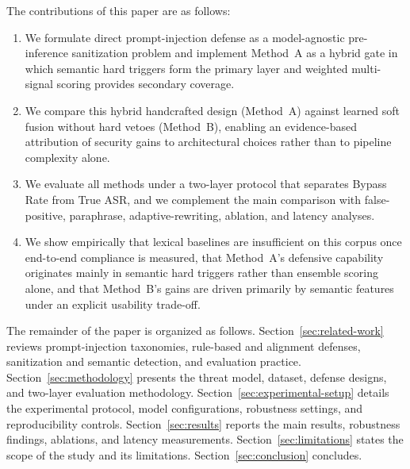 The contributions of this paper are as follows:
\begin{enumerate}
  \item We formulate direct prompt-injection defense as a model-agnostic pre-inference sanitization problem and implement Method~A as a hybrid gate in which semantic hard triggers form the primary layer and weighted multi-signal scoring provides secondary coverage.
  \item We compare this hybrid handcrafted design (Method~A) against learned soft fusion without hard vetoes (Method~B), enabling an evidence-based attribution of security gains to architectural choices rather than to pipeline complexity alone.
  \item We evaluate all methods under a two-layer protocol that separates Bypass Rate from True ASR, and we complement the main comparison with false-positive, paraphrase, adaptive-rewriting, ablation, and latency analyses.
  \item We show empirically that lexical baselines are insufficient on this corpus once end-to-end compliance is measured, that Method~A's defensive capability originates mainly in semantic hard triggers rather than ensemble scoring alone, and that Method~B's gains are driven primarily by semantic features under an explicit usability trade-off.
\end{enumerate}

The remainder of the paper is organized as follows.
Section~\ref{sec:related-work} reviews prompt-injection taxonomies, rule-based and alignment defenses, sanitization and semantic detection, and evaluation practice.
Section~\ref{sec:methodology} presents the threat model, dataset, defense designs, and two-layer evaluation methodology.
Section~\ref{sec:experimental-setup} details the experimental protocol, model configurations, robustness settings, and reproducibility controls.
Section~\ref{sec:results} reports the main results, robustness findings, ablations, and latency measurements.
Section~\ref{sec:limitations} states the scope of the study and its limitations.
Section~\ref{sec:conclusion} concludes.
